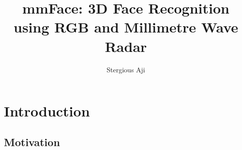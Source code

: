 \documentclass{mpaper}
\begin{document}
\title{mmFace: 3D Face Recognition using RGB and Millimetre
Wave Radar}
\author{Stergious Aji}

\maketitle

\begin{abstract}


\end{abstract}



\section{Introduction}


\subsection{Motivation}
\end{document}
